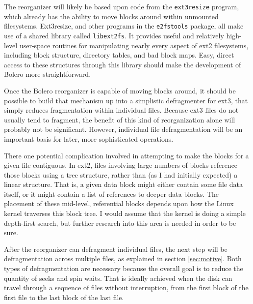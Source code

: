 \documentclass[10pt]{article}
\begin{document}
The reorganizer will likely be based upon code from the \texttt{ext3resize} program,
which already has the ability to move blocks around within unmounted filesystems. Ext3resize, and other
programs in the \texttt{e2fstools} package, all make use of a shared library called
\texttt{libext2fs}\cite{libext2fs}. It provides useful and relatively high-level user-space routines for
manipulating nearly every aspect of ext2 filesystems, including block
structure, directory tables, and bad block maps. Easy, direct access to these structures
through this library should make the development of Bolero more straightforward.

Once the Bolero reorganizer is capable of moving blocks around, it should be
possible to build that mechanism up into a simplistic defragmenter for ext3, that
simply reduces fragmentation within individual files. Because ext3 files do
not usually tend to fragment, the benefit of this kind of reorganization alone will
probably not be significant. However, individual file defragmentation will be an important
basis for later, more sophisticated operations.

There one potential complication involved in attempting to make the blocks for
a given file contiguous. In ext2, files involving large numbers of blocks
reference those blocks using a tree structure\cite{ext2intro}, rather than (as I had
initially expected) a linear structure. That is, a given data block might either
contain some file data itself, or it might contain a list of references to deeper
data blocks. The placement of these mid-level, referential blocks depends upon how the
Linux kernel traverses this block tree. I would assume that the kernel is
doing a simple depth-first search, but further research into this area is needed
in order to be sure.

After the reorganizer can defragment individual files, the next step will be
defragmentation across multiple files, as explained in section \ref{sec:motive}.
Both types of defragmentation are necessary because the overall goal is to reduce the quantity
of seeks and spin waits. That is ideally achieved when the disk can travel through
a sequence of files without interruption, from the first block of the first file to the last
block of the last file\cite{autolocality}.
\end{document}
